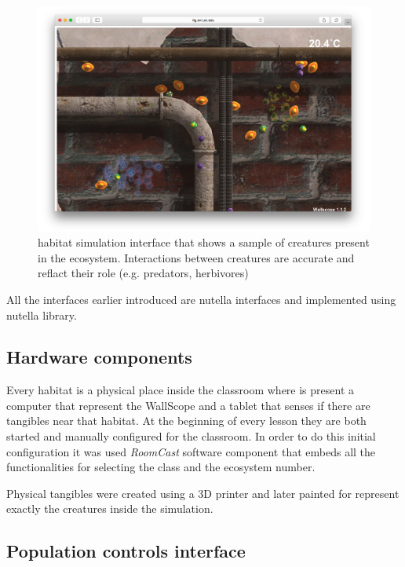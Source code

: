 \begin{figure}
\centering
\includegraphics[width=5in]{images/ecosystem-1.png}
\caption{habitat simulation interface that shows a sample of creatures present in the ecosystem. Interactions between creatures are accurate and reflact their role (e.g. predators, herbivores)}
\label{fig:ecosystem_1}
\end{figure}

All the interfaces earlier introduced are nutella interfaces and implemented using nutella library.

\subsection{Hardware components}
Every habitat is a physical place inside the classroom where is present a computer that represent the WallScope and a tablet that senses if there are tangibles near that habitat. At the beginning of every lesson they are both started and manually configured for the classroom. In order to do this initial configuration it was used \textit{RoomCast} software component that embeds all the functionalities for selecting the class and the ecosystem number.

Physical tangibles were created using a 3D printer and later painted for represent exactly the creatures inside the simulation.

\subsection{Population controls interface}
\label{subsec:population_control_interface}

